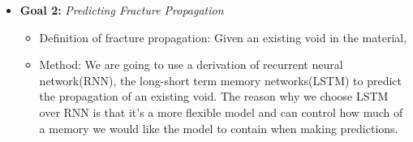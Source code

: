 \begin{itemize}
\item \textbf{Goal 2:} \emph{Predicting Fracture Propagation} 
\begin{itemize} 
    \item Definition of fracture propagation: Given an existing void in the material,
    \item Method: We are going to use a derivation of recurrent neural network(RNN), the long-short term memory networks(LSTM) to predict the propagation of an existing void. The reason why we choose LSTM over RNN is that it's a more flexible model and can control how much of a memory we would like the model to contain when making predictions.
    
\end{itemize}



\end{itemize}
